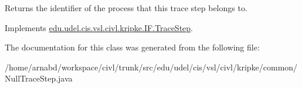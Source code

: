 \begin{DoxyReturn}{Returns}
the identifier of the process that this trace step belongs to. 
\end{DoxyReturn}


Implements \hyperlink{interfaceedu_1_1udel_1_1cis_1_1vsl_1_1civl_1_1kripke_1_1IF_1_1TraceStep_a7f46e65b0afcd1ab8900baa3ef364028}{edu.\+udel.\+cis.\+vsl.\+civl.\+kripke.\+I\+F.\+Trace\+Step}.



The documentation for this class was generated from the following file\+:\begin{DoxyCompactItemize}
\item 
/home/arnabd/workspace/civl/trunk/src/edu/udel/cis/vsl/civl/kripke/common/Null\+Trace\+Step.\+java\end{DoxyCompactItemize}

